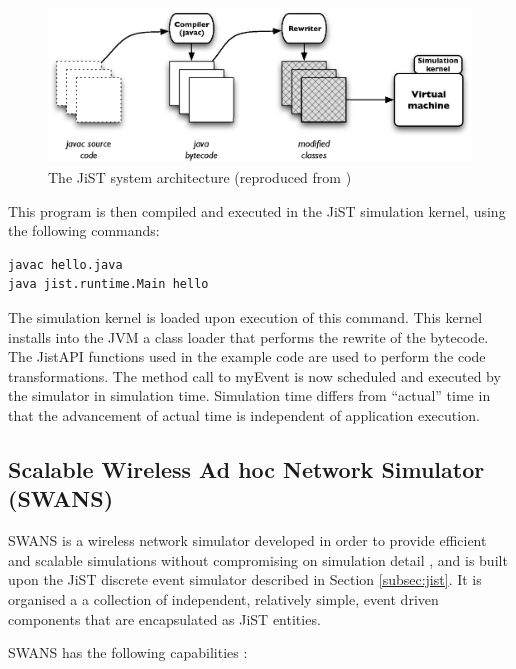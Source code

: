 \begin{figure} 
\centering
\label{Fig:JiST_architecture}
\includegraphics[scale=0.72]{img/JiST_architecture.eps} \caption[The JiST 
System Architecture]{The JiST system architecture (reproduced from
\cite{barr_JIST:2005})}
\end{figure} 
 
This program is then compiled and executed in the JiST simulation
kernel, using the following commands:

  
\begin{lstlisting}[frame=trbl, basewidth={0.55em, 0.6em}, captionpos=b, 
basicstyle=\ttfamily\footnotesize, breaklines, caption = Execution of the
program in the JiST, label = listing:JiST ]  
javac hello.java
java jist.runtime.Main hello
\end{lstlisting}


The simulation kernel is loaded upon execution of this command. This kernel
installs into the JVM a class loader that performs the rewrite of the bytecode.
The JistAPI functions used in the example code are used to perform the
code transformations. The method call to myEvent is now scheduled and executed
by the simulator in simulation time. Simulation time differs from ``actual''
time in that the advancement of actual time is independent of application
execution. 
 
\subsection{Scalable Wireless Ad hoc Network Simulator (SWANS)}
SWANS is a wireless network simulator developed in order to provide efficient
and scalable simulations without compromising on simulation detail \cite{barr_SWANS},
and is built upon the JiST discrete event simulator described in Section \ref{subsec:jist}. 
It is organised a a collection of independent, relatively simple, event driven
components that are encapsulated as JiST entities. 
  
SWANS has the following capabilities \cite{barr_SWANS}:

